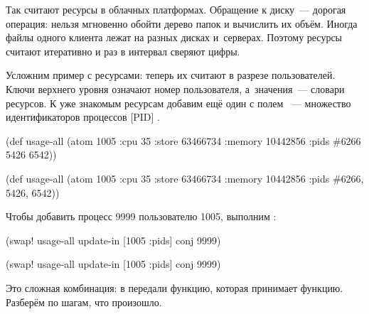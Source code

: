 \fi


Так считают ресурсы в облачных платформах. Обращение к диску~--- дорогая
операция: нельзя мгновенно обойти дерево папок и вычислить их объём. Иногда
файлы одного клиента лежат на разных дисках и~серверах. Поэтому ресурсы считают
итеративно и раз в интервал сверяют цифры.


Усложним пример с ресурсами: теперь их считают в разрезе пользователей. Ключи
верхнего уровня означают номер пользователя, а~значения~--- словари ресурсов. К
уже знакомым ресурсам добавим ещё один с полем ~--- множество
идентификаторов процессов [PID]
.

\ifnarrow

\begin{clojure/lines}
(def usage-all
  (atom {1005 {:cpu 35
               :store 63466734
               :memory 10442856
               :pids #{6266
                       5426
                       6542}}}))
\end{clojure/lines}

\else

\begin{clojure/lines}
(def usage-all
  (atom {1005 {:cpu 35
               :store 63466734
               :memory 10442856
               :pids #{6266, 5426, 6542}}}))
\end{clojure/lines}

\fi

Чтобы добавить процесс 9999 пользователю 1005, выполним :

\ifnarrow

\begin{clojure}
(swap! usage-all
  update-in [1005 :pids] conj 9999)
\end{clojure}

\else

\begin{clojure}
(swap! usage-all update-in [1005 :pids] conj 9999)
\end{clojure}

\fi

Это сложная комбинация: в  передали функцию, которая принимает
функцию. Разберём по шагам, что произошло.

